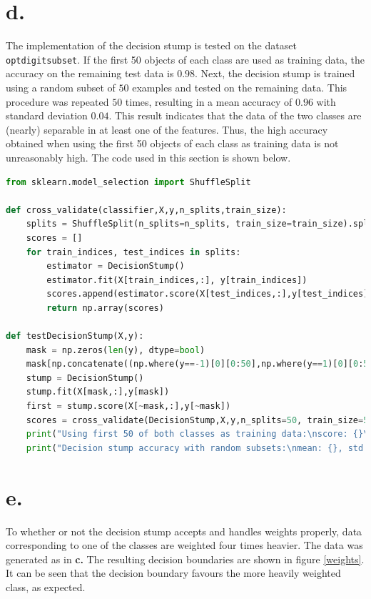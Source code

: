 \documentclass [a4paper] {report}
\begin{document}
	\section*{d.}
	The implementation of the decision stump is tested on the dataset \texttt{optdigitsubset}. If the first 50 objects of each class are used as training data, the accuracy on the remaining test data is $0.98$. Next, the decision stump is trained using a random subset of $50$ examples and tested on the remaining data. This procedure was repeated $50$ times, resulting in a mean accuracy of $0.96$ with standard deviation $0.04$. This result indicates that the data of the two classes are (nearly) separable in at least one of the features. Thus, the high accuracy obtained when using the first 50 objects of each class as training data is not unreasonably high. The code used in this section is shown below.
	\begin{lstlisting}[language=python, frame=l, basicstyle=\ttfamily\scriptsize]
from sklearn.model_selection import ShuffleSplit	

def cross_validate(classifier,X,y,n_splits,train_size):
	splits = ShuffleSplit(n_splits=n_splits, train_size=train_size).split(X)
	scores = []
	for train_indices, test_indices in splits:
		estimator = DecisionStump()
		estimator.fit(X[train_indices,:], y[train_indices])
		scores.append(estimator.score(X[test_indices,:],y[test_indices]))
		return np.array(scores)

def testDecisionStump(X,y):
	mask = np.zeros(len(y), dtype=bool)
	mask[np.concatenate((np.where(y==-1)[0][0:50],np.where(y==1)[0][0:50]))]=True
	stump = DecisionStump()
	stump.fit(X[mask,:],y[mask])
	first = stump.score(X[~mask,:],y[~mask])
	scores = cross_validate(DecisionStump,X,y,n_splits=50, train_size=50)
	print("Using first 50 of both classes as training data:\nscore: {}\n".format(first))
	print("Decision stump accuracy with random subsets:\nmean: {}, std: {}\n".format(scores.mean(),scores.std()))
	\end{lstlisting}
	
	\section*{e.}
	To whether or not the decision stump accepts and handles weights properly, data corresponding to one of the classes are weighted four times heavier. The data was generated as in \textbf{c.} The resulting decision boundaries are shown in figure \ref{weights}. It can be seen that the decision boundary favours the more heavily weighted class, as expected.
	
\end{document}
